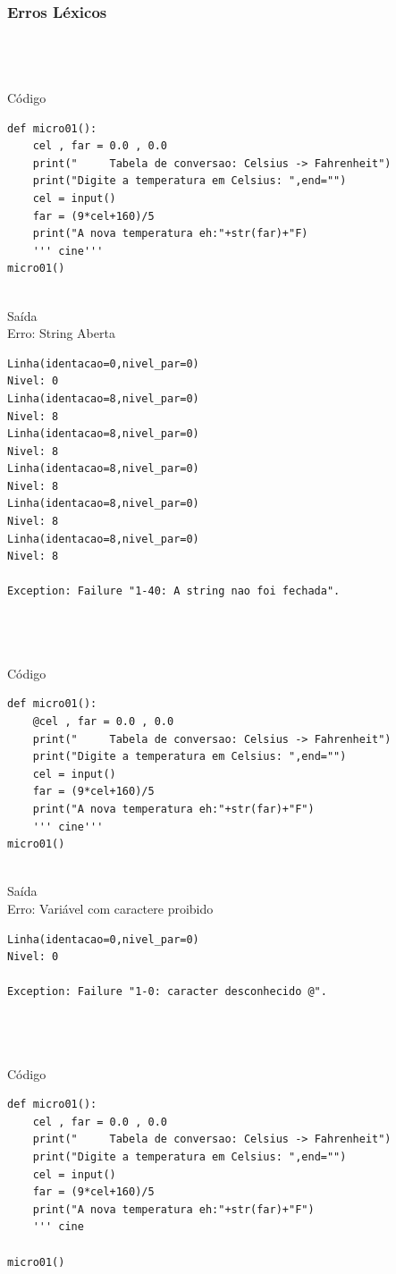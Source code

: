\documentclass{article}
\begin{document}
\subsubsection{Erros Léxicos}
\\\\\\Código
\begin{lstlisting}
def micro01():
	cel , far = 0.0 , 0.0
	print("		Tabela de conversao: Celsius -> Fahrenheit")
	print("Digite a temperatura em Celsius: ",end="")
	cel = input()
	far = (9*cel+160)/5
	print("A nova temperatura eh:"+str(far)+"F)
	''' cine'''
micro01()
\end{lstlisting}

\\Saída
\\Erro: String Aberta
\begin{lstlisting}
Linha(identacao=0,nivel_par=0)
Nivel: 0
Linha(identacao=8,nivel_par=0)
Nivel: 8
Linha(identacao=8,nivel_par=0)
Nivel: 8
Linha(identacao=8,nivel_par=0)
Nivel: 8
Linha(identacao=8,nivel_par=0)
Nivel: 8
Linha(identacao=8,nivel_par=0)
Nivel: 8

Exception: Failure "1-40: A string nao foi fechada".
\end{lstlisting}

\\\\\\Código
\begin{lstlisting}
def micro01():
	@cel , far = 0.0 , 0.0
	print("		Tabela de conversao: Celsius -> Fahrenheit")
	print("Digite a temperatura em Celsius: ",end="")
	cel = input()
	far = (9*cel+160)/5
	print("A nova temperatura eh:"+str(far)+"F")
	''' cine'''
micro01()
\end{lstlisting}

\\Saída
\\Erro: Variável com caractere proibido
\begin{lstlisting}
Linha(identacao=0,nivel_par=0)
Nivel: 0

Exception: Failure "1-0: caracter desconhecido @".
\end{lstlisting}

\\\\\\Código
\begin{lstlisting}
def micro01():
	cel , far = 0.0 , 0.0
	print("		Tabela de conversao: Celsius -> Fahrenheit")
	print("Digite a temperatura em Celsius: ",end="")
	cel = input()
	far = (9*cel+160)/5
	print("A nova temperatura eh:"+str(far)+"F")
	''' cine
	
micro01()
\end{lstlisting}
\end{document}

